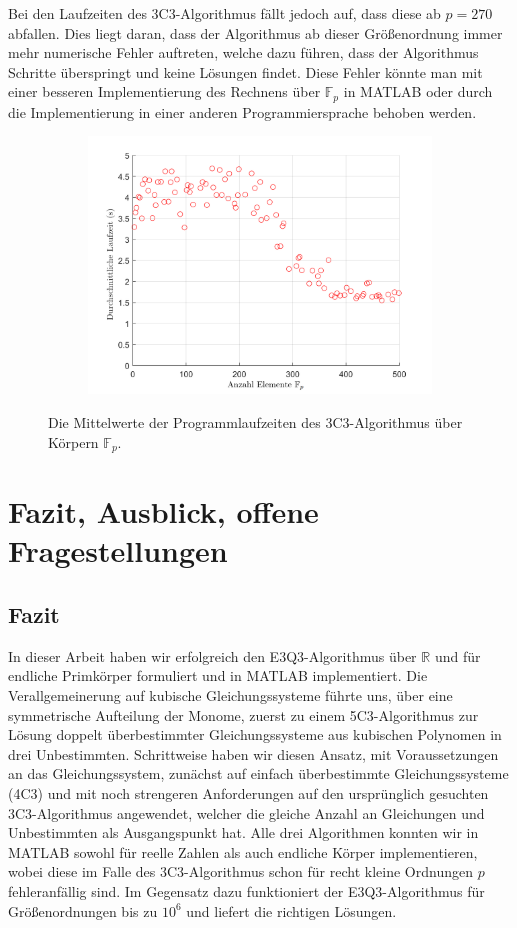 \documentclass[a4paper,oneside, 11pt, openany%
]{article}
\newcommand{\R}{{\mathbb R}}
\newcommand{\F}[1]{\mathbb{F}_{#1}}
\theoremstyle{custom}
\theoremstyle{custom}
\begin{document}
	\newpage
	Bei den Laufzeiten des 3C3-Algorithmus fällt jedoch auf, dass diese ab $p=270$ abfallen.
	Dies liegt daran, dass der Algorithmus ab dieser Größenordnung immer mehr numerische Fehler auftreten, welche dazu führen, dass der Algorithmus Schritte überspringt und keine Lösungen findet. Diese Fehler könnte man mit einer besseren Implementierung des Rechnens über $\F{p}$ in MATLAB oder durch die Implementierung in einer anderen Programmiersprache behoben werden.
	\begin{figure}[H]\label{fig:e3c3_runtime}
		\begin{subfigure}[b]{0.7\textwidth}
			\includegraphics[width=\textwidth]{"images/runtime_e3c3.png"}
		\end{subfigure}
		\caption{Die Mittelwerte der Programmlaufzeiten des 3C3-Algorithmus über Körpern $\F{p}$.}
	\end{figure}
	\newpage
	\section{Fazit, Ausblick, offene Fragestellungen}\label{sec:fazit}
	\subsection*{Fazit}
In dieser Arbeit haben wir erfolgreich den E3Q3-Algorithmus über $\R$ und für endliche Primkörper formuliert und in MATLAB implementiert. Die Verallgemeinerung auf kubische Gleichungssysteme führte uns, über eine symmetrische Aufteilung der Monome, zuerst zu einem 5C3-Algorithmus zur Lösung doppelt überbestimmter Gleichungssysteme aus kubischen Polynomen in drei Unbestimmten. Schrittweise haben wir diesen Ansatz, mit Voraussetzungen an das Gleichungssystem, zunächst auf einfach überbestimmte Gleichungssysteme (4C3) und mit noch strengeren Anforderungen auf den ursprünglich gesuchten 3C3-Algorithmus angewendet, welcher die gleiche Anzahl an Gleichungen und Unbestimmten als Ausgangspunkt hat. Alle drei Algorithmen konnten wir in MATLAB sowohl für reelle Zahlen als auch endliche Körper implementieren, wobei diese im Falle des 3C3-Algorithmus schon für recht kleine Ordnungen $p$ fehleranfällig sind. Im Gegensatz dazu funktioniert der E3Q3-Algorithmus für Größenordnungen bis zu $10^6$ und liefert die richtigen Lösungen.
	
\end{document}
